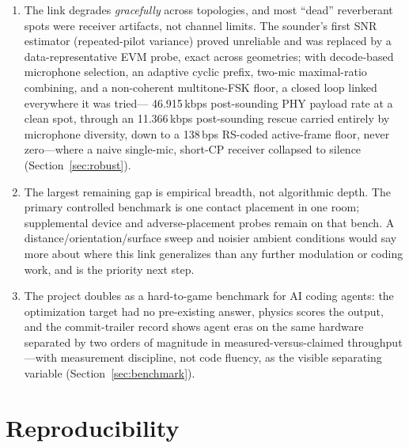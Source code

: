\documentclass[11pt]{article}
\begin{document}
\begin{enumerate}
        OTA console aggregate corresponding to 38.400\,kbps of user payload---
        \emph{exceeding} the harness headline on the same hardware, while the
        missing matching machine record remains explicit. On top sit two decision surfaces---an
        SNR/delay-spread MCS sounder that never refuses to connect, and a
        channel-metric repositioning guide---that turn the project's
        measured-channel-first philosophy into APIs an application can call.
  \item The link degrades \emph{gracefully} across topologies, and most
        ``dead'' reverberant spots were receiver artifacts, not channel limits.
        The sounder's first SNR estimator (repeated-pilot variance) proved
        unreliable and was replaced by a data-representative EVM probe, exact
        across geometries; with decode-based microphone selection, an adaptive
        cyclic prefix, two-mic maximal-ratio combining, and a non-coherent
        multitone-FSK floor, a closed loop linked everywhere it was tried---
        46.915\,kbps post-sounding PHY payload rate at a clean spot, through an
        11.366\,kbps post-sounding rescue carried entirely by microphone
        diversity, down to a 138\,bps RS-coded active-frame floor,
        never zero---where a naive single-mic, short-CP receiver collapsed to
        silence (Section~\ref{sec:robust}).
  \item The largest remaining gap is empirical breadth, not algorithmic depth.
        The primary controlled benchmark is one contact placement in one room;
        supplemental device and adverse-placement probes remain on that bench.
        A distance/orientation/surface sweep and noisier ambient conditions would
        say more about where this link generalizes than any further modulation
        or coding work, and is the priority next step.
  \item The project doubles as a hard-to-game benchmark for AI coding
        agents: the optimization target had no pre-existing answer, physics
        scores the output, and the commit-trailer record shows agent eras on
        the same hardware separated by two orders of magnitude in
        measured-versus-claimed throughput---with measurement discipline,
        not code fluency, as the visible separating variable
        (Section~\ref{sec:benchmark}).
\end{enumerate}

\section{Reproducibility}
\label{sec:repro}
\end{document}
